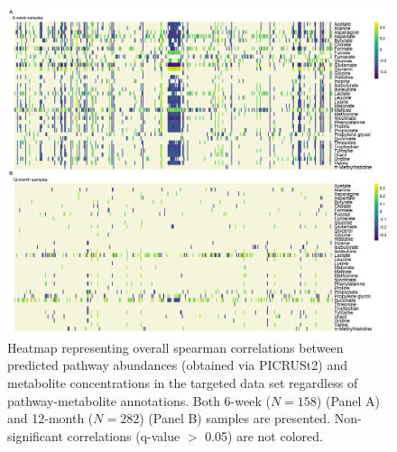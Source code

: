 \begin{figure}[!h]
    \centering
    \includegraphics[width=0.95\linewidth]{figures/appB_fs11.png}
    \caption[Heatmap representing overall spearman correlations between predicted pathway abundances (obtained via PICRUSt2) and metabolite concentrations in the targeted data set regardless of pathway-metabolite annotations]{Heatmap representing overall spearman correlations between predicted pathway abundances (obtained via PICRUSt2) and metabolite concentrations in the targeted data set regardless of pathway-metabolite annotations. Both 6-week ($N = 158$) (Panel A) and 12-month ($N = 282$) (Panel B) samples are presented. Non-significant correlations (q-value $>$ 0.05) are not colored.}
    \label{fig:b11}
\end{figure}





 
 
